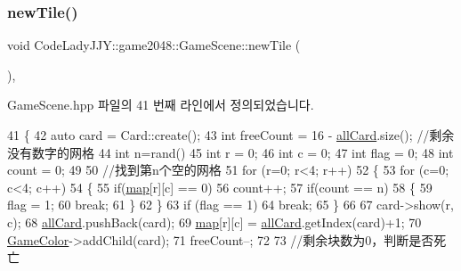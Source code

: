 \subsubsection{\texorpdfstring{new\+Tile()}{newTile()}}
{\footnotesize\ttfamily void Code\+Lady\+J\+J\+Y\+::game2048\+::\+Game\+Scene\+::new\+Tile (\begin{DoxyParamCaption}{ }\end{DoxyParamCaption})\hspace{0.3cm}{\ttfamily [inline]}, {\ttfamily [private]}}



Game\+Scene.\+hpp 파일의 41 번째 라인에서 정의되었습니다.


\begin{DoxyCode}
41               \{
42     \textcolor{keyword}{auto} card = Card::create();
43     \textcolor{keywordtype}{int} freeCount = 16 - \hyperlink{class_code_lady_j_j_y_1_1game2048_1_1_game_scene_aadcd54235c70f1d794213f50f429437f}{allCard}.size(); \textcolor{comment}{//剩余没有数字的网格}
44     \textcolor{keywordtype}{int} n=rand()%
45     \textcolor{keywordtype}{int} r = 0;
46     \textcolor{keywordtype}{int} c = 0;
47     \textcolor{keywordtype}{int} flag = 0;
48     \textcolor{keywordtype}{int} count = 0;
49 
50     \textcolor{comment}{//找到第n个空的网格}
51     \textcolor{keywordflow}{for} (r=0; r<4; r++)
52     \{
53         \textcolor{keywordflow}{for} (c=0; c<4; c++)
54         \{
55             \textcolor{keywordflow}{if}(\hyperlink{class_code_lady_j_j_y_1_1game2048_1_1_game_scene_a4d8924d645182d1e2f6b44390e4101ea}{map}[r][c] == 0)
56                 count++;
57             \textcolor{keywordflow}{if}(count == n)
58             \{
59                 flag = 1;
60                 \textcolor{keywordflow}{break};
61             \}
62         \}
63         \textcolor{keywordflow}{if} (flag == 1)
64             \textcolor{keywordflow}{break};
65     \}
66 
67     card->show(r, c);
68     \hyperlink{class_code_lady_j_j_y_1_1game2048_1_1_game_scene_aadcd54235c70f1d794213f50f429437f}{allCard}.pushBack(card);
69     \hyperlink{class_code_lady_j_j_y_1_1game2048_1_1_game_scene_a4d8924d645182d1e2f6b44390e4101ea}{map}[r][c] = \hyperlink{class_code_lady_j_j_y_1_1game2048_1_1_game_scene_aadcd54235c70f1d794213f50f429437f}{allCard}.getIndex(card)+1;
70     \hyperlink{class_code_lady_j_j_y_1_1game2048_1_1_game_scene_a191affcd48b814ad840883e491107a2b}{GameColor}->addChild(card);
71     freeCount--;
72     
73     \textcolor{comment}{//剩余块数为0，判断是否死亡}

\end{DoxyCode}
